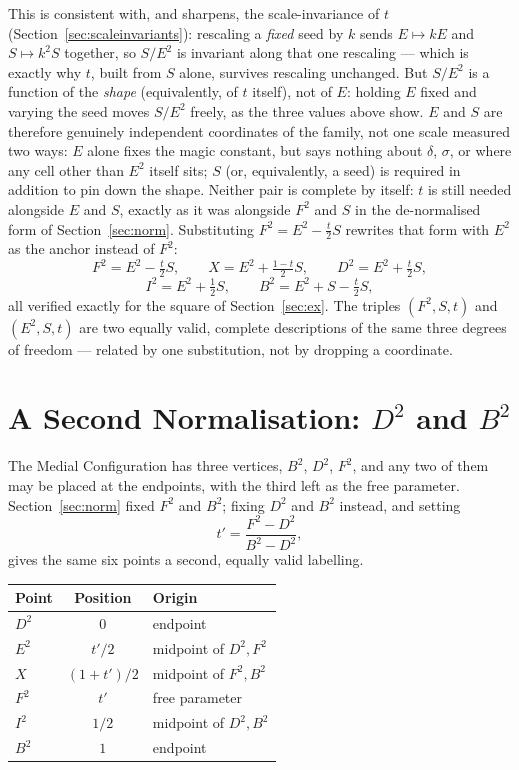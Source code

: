 \documentclass[12pt]{article}
\theoremstyle{remark}
\begin{document}
This is consistent with, and sharpens, the scale-invariance of $t$
(Section~\ref{sec:scaleinvariants}): rescaling a \emph{fixed} seed by
$k$ sends $E \mapsto kE$ and $S \mapsto k^2S$ together, so $S/E^2$
is invariant along that one rescaling --- which is exactly why $t$,
built from $S$ alone, survives rescaling unchanged. But $S/E^2$ is a
function of the \emph{shape} (equivalently, of $t$ itself), not of
$E$: holding $E$ fixed and varying the seed moves $S/E^2$ freely, as
the three values above show. $E$ and $S$ are therefore genuinely
independent coordinates of the family, not one scale measured two
ways: $E$ alone fixes the magic constant, but says nothing about
$\delta$, $\sigma$, or where any cell other than $E^2$ itself sits;
$S$ (or, equivalently, a seed) is required in addition to pin down
the shape. Neither pair is complete by itself: $t$ is still needed
alongside $E$ and $S$, exactly as it was alongside $F^2$ and $S$ in
the de-normalised form of Section~\ref{sec:norm}. Substituting
$F^2 = E^2 - \tfrac{t}{2}S$ rewrites that form with $E^2$ as the
anchor instead of $F^2$:
\[
F^2 = E^2 - \tfrac{t}{2}S, \qquad
X = E^2 + \tfrac{1-t}{2}S, \qquad
D^2 = E^2 + \tfrac{t}{2}S,
\]
\[
I^2 = E^2 + \tfrac12 S, \qquad
B^2 = E^2 + S - \tfrac{t}{2}S ,
\]
all verified exactly for the square of Section~\ref{sec:ex}. The
triples $(F^2,S,t)$ and $(E^2,S,t)$ are two equally valid, complete
descriptions of the same three degrees of freedom --- related by one
substitution, not by dropping a coordinate.

\section{A Second Normalisation: $D^2$ and $B^2$}\label{sec:norm2}

The Medial Configuration has three vertices, $B^2$, $D^2$, $F^2$, and
any two of them may be placed at the endpoints, with the third left as
the free parameter. Section~\ref{sec:norm} fixed $F^2$ and $B^2$;
fixing $D^2$ and $B^2$ instead, and setting
\[
t' = \frac{F^2 - D^2}{B^2 - D^2},
\]
gives the same six points a second, equally valid labelling.

\begin{center}
\begin{tabular}{lcl}
\hline
Point & Position & Origin \\
\hline
$D^2$ & $0$        & endpoint \\
$E^2$ & $t'/2$     & midpoint of $D^2, F^2$ \\
$X$   & $(1+t')/2$ & midpoint of $F^2, B^2$ \\
$F^2$ & $t'$       & free parameter \\
$I^2$ & $1/2$      & midpoint of $D^2, B^2$ \\
$B^2$ & $1$        & endpoint \\
\hline
\end{tabular}
\end{center}
\end{document}
